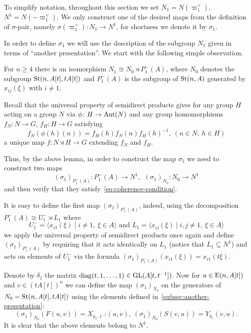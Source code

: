 To simplify notation, throughout this section we set $N_1 = N(\varpi_1^\vee),$ $N^1 = N(-\varpi_1^\vee)$.
We only construct one of the desired maps from the definition of $\sigma$-pair, namely $\sigma(\varpi_1^\vee) \colon N_1 \to N^1$,
for shortness we denote it by $\sigma_1$.

In order to define $\sigma_1$ we will use the description of the subgroup $N_1$ given in terms of ``another presentation''.
We start with the following simple observation.
\begin{lemma}
    \label{lem:n1-decomp} For $n\geq 4$ there is an isomorphism $N_1 \cong N_{0} \rtimes P_1^-(A)$,
    where $N_{0}$ denotes the subgroup $\operatorname{St}(n, A[t], tA[t])$ and $P_1^-(A)$ is the subgroup of $\operatorname{St}(n, A)$ generated by $x_{ij}(\xi)$ with $i\neq 1$.
\end{lemma}

Recall that the universal property of semidirect products gives for any group $H$ acting on a group $N$ via $\phi \colon H \to \operatorname{Aut}(N)$
and any group homomorphisms $f_N\colon N \to G$, $f_H\colon H \to G$ satisfying
\begin{equation}
    \label{eq:coherence-condition} f_N(\phi(h)(n)) = f_H(h) f_N(n) f_H(h)^{-1},\ (n\in N,\ h\in H)
\end{equation}
a unique map $f\colon N \rtimes H \to G$ extending $f_N$ and $f_H$.

Thus, by the above lemma, in order to construct the map $\sigma_1$ we need to construct two maps
\[ (\sigma_1)_{P_1^-(A)} \colon P_1^-(A) \to N^1, \ \ (\sigma_1)_{N_{0}} \colon N_{0} \to N^1\]
and then verify that they satisfy~\eqref{eq:coherence-condition}.

It is easy to define the first map $(\sigma_1)_{P_1^-(A)}$, indeed, using the decomposition $P_1^-(A) \cong U^-_1 \rtimes L_1$ where %
\[U^-_1 = \langle x_{i1}(\xi) \mid i\neq 1,\ \xi\in A \rangle \text{ and } L_1 = \langle x_{ij}(\xi) \mid i,  j \neq 1,\ \xi\in A\rangle \]
we apply the universal property of semidirect products once again
and define $(\sigma_1)_{P_1^-(A)}$ by requiring that it acts identically on $L_1$ (notice that $L_1 \subseteq N^1$) %
and acts on elements of $U^-_1$ via the formula $(\sigma_1)_{P_1^-(A)}(x_{i1}(\xi))= x_{i1}(t\xi)$.


Denote by $\delta_1$ the matrix $\mathrm{diag}(t, 1, \ldots, 1) \in \operatorname{GL}(A[t, t^{-1}])$.
Now for $u \in \operatorname{E}(n, A[t])$ and $v \in (tA[t])^n$ we can define the map $(\sigma_1)_{N_0}$ on the generators of $N_{0}=\operatorname{St}(n, A[t], tA[t])$
using the elements defined in~\cref{subsec:another-presentation}:
\begin{equation*}
(\sigma_1)
    _{N_0} (F(u, v)) = X_{\delta_1 \cdot t^{-1}}(u, v),\ (\sigma_1)_{N_0} (S(v, u)) = Y_{\delta_1}(v, u).
\end{equation*}
It is clear that the above elements belong to $N^1$.

